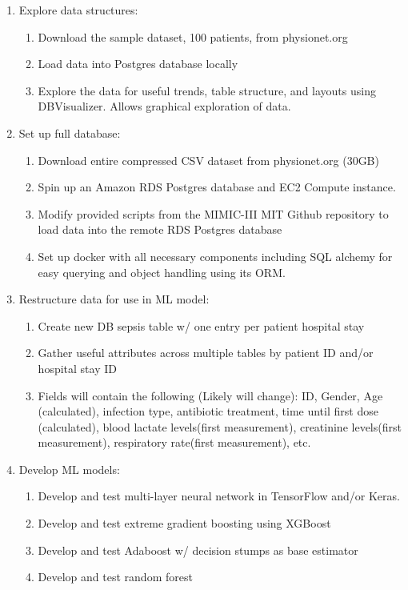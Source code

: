 \documentclass[11pt]{article}
\begin{document}
\begin{enumerate}	

	\item Explore data structures:
		\begin{enumerate}
			\item Download the sample dataset, 100 patients, from physionet.org
			\item Load data into Postgres database locally
			\item Explore the data for useful trends, table structure, and layouts using DBVisualizer. Allows graphical exploration of data.
		\end{enumerate}
		
	\item Set up full database:

		\begin{enumerate}
			\item Download entire compressed CSV dataset from physionet.org (30GB)
			\item Spin up an Amazon RDS Postgres database and EC2 Compute instance.
			\item Modify provided scripts from the MIMIC-III MIT Github repository to load data into the remote RDS Postgres database
			\item Set up docker with all necessary components including SQL alchemy for easy querying and object handling using its ORM.
		\end{enumerate}
		
		\item Restructure data for use in ML model:
		
		\begin{enumerate}
			\item Create new DB sepsis table w/ one entry per patient hospital stay
			\item Gather useful attributes across multiple tables by patient ID and/or hospital stay ID
			\item Fields will contain the following (Likely will change): ID, Gender, Age (calculated), infection type, antibiotic treatment, time until first dose (calculated), blood lactate levels(first measurement), creatinine levels(first measurement), respiratory rate(first measurement), etc.
		\end{enumerate}

		
		\item Develop ML models:
	
		\begin{enumerate}
			\item Develop and test multi-layer neural network in TensorFlow and/or Keras.
			\item Develop and test extreme gradient boosting using XGBoost
			\item Develop and test Adaboost w/ decision stumps as base estimator
			\item Develop and test random forest
		\end{enumerate}
		

\end{enumerate}
\end{document}
